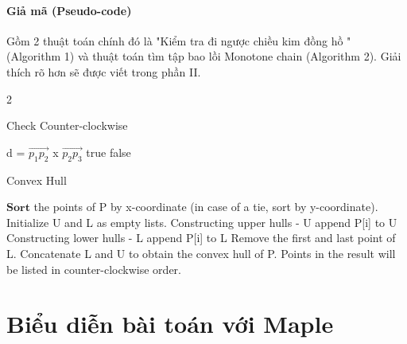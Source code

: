 \documentclass[12pt]{article}
\begin{document}
      \subsection{Giả mã (Pseudo-code)}
        Gồm 2 thuật toán chính đó là "Kiểm tra đi ngược chiều kim đồng hồ " (Algorithm 1) và thuật toán tìm tập bao lồi Monotone chain (Algorithm 2). Giải thích rõ hơn sẽ được viết trong phần II.
        \begin{algorithm}2
          \caption{Check Counter-clockwise}
          \begin{algorithmic}[1]
              \State d = $\overrightarrow{p_1p_2}$ x $\overrightarrow{p_2p_3}$
               \Return true
              \Else \text{ } \Return false 
              \EndIf
            \EndProcedure
          \end{algorithmic}
        \end{algorithm}
        \begin{algorithm}
          \caption{Convex Hull}
          \begin{algorithmic}[1]
              \State $\textbf{Sort}$ the points of P by x-coordinate (in case of a tie, sort by y-coordinate).
              \State Initialize U and L as empty lists.
              \State Constructing upper hulls - U
                \EndWhile
                \State append P[i] to U
              \EndFor
              \State Constructing lower hulls - L
                \EndWhile
                \State append P[i] to L
              \EndFor  
              \State Remove the first and last point of L.
              \State Concatenate L and U to obtain the convex hull of P.
              \State Points in the result will be listed in counter-clockwise order.
            \EndProcedure
          \end{algorithmic}
        \end{algorithm}
  \newpage
  \part{Biểu diễn bài toán với Maple}
\end{document}

